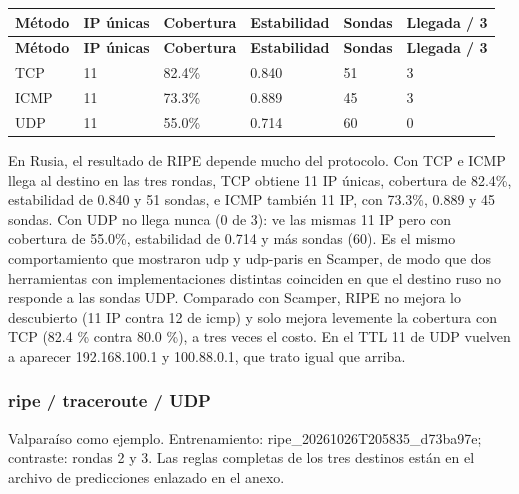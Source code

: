 \endgroup
\begingroup
\fontsize{9}{11}\selectfont
\addtocounter{table}{-1}
\begin{longtable}{p{3.1cm}p{1.9cm}p{2.1cm}p{2.1cm}p{1.8cm}p{2.1cm}}
\toprule
\textbf{Método} & \textbf{IP únicas} & \textbf{Cobertura} & \textbf{Estabilidad} & \textbf{Sondas} & \textbf{Llegada / 3} \\ \midrule
\endfirsthead
\toprule
\textbf{Método} & \textbf{IP únicas} & \textbf{Cobertura} & \textbf{Estabilidad} & \textbf{Sondas} & \textbf{Llegada / 3} \\ \midrule
\endhead
TCP & 11 & 82.4\% & 0.840 & 51 & 3 \\
ICMP & 11 & 73.3\% & 0.889 & 45 & 3 \\
UDP & 11 & 55.0\% & 0.714 & 60 & 0 \\
\bottomrule
\end{longtable}
\endgroup


En Rusia, el resultado de RIPE depende mucho del protocolo. Con TCP e ICMP llega al destino en las tres rondas, TCP obtiene 11 IP únicas, cobertura de 82.4\%, estabilidad de 0.840 y 51 sondas, e ICMP también 11 IP, con 73.3\%, 0.889 y 45 sondas. Con UDP no llega nunca (0 de 3): ve las mismas 11 IP pero con cobertura de 55.0\%, estabilidad de 0.714 y más sondas (60). Es el mismo comportamiento que mostraron udp y udp-paris en Scamper, de modo que dos herramientas con implementaciones distintas coinciden en que el destino ruso no responde a las sondas UDP. Comparado con Scamper, RIPE no mejora lo descubierto (11 IP contra 12 de icmp) y solo mejora levemente la cobertura con TCP (82.4 \% contra 80.0 \%), a tres veces el costo. En el TTL 11 de UDP vuelven a aparecer 192.168.100.1 y 100.88.0.1, que trato igual que arriba.

\subsubsection{ripe / traceroute / UDP}
Valparaíso como ejemplo. Entrenamiento: ripe\_\allowbreak{}20261026T205835\_\allowbreak{}d73ba97e; contraste: rondas 2 y 3. Las reglas completas de los tres destinos están en el archivo de predicciones enlazado en el anexo.

